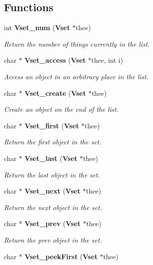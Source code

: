 \subsection*{Functions}
\begin{DoxyCompactItemize}
\item 
int {\bf Vset\+\_\+num} ({\bf Vset} $\ast$thee)
\begin{DoxyCompactList}\small\item\em Return the number of things currently in the list. \end{DoxyCompactList}\item 
char $\ast$ {\bf Vset\+\_\+access} ({\bf Vset} $\ast$thee, int i)
\begin{DoxyCompactList}\small\item\em Access an object in an arbitrary place in the list. \end{DoxyCompactList}\item 
char $\ast$ {\bf Vset\+\_\+create} ({\bf Vset} $\ast$thee)
\begin{DoxyCompactList}\small\item\em Create an object on the end of the list. \end{DoxyCompactList}\item 
char $\ast$ {\bf Vset\+\_\+first} ({\bf Vset} $\ast$thee)
\begin{DoxyCompactList}\small\item\em Return the first object in the set. \end{DoxyCompactList}\item 
char $\ast$ {\bf Vset\+\_\+last} ({\bf Vset} $\ast$thee)
\begin{DoxyCompactList}\small\item\em Return the last object in the set. \end{DoxyCompactList}\item 
char $\ast$ {\bf Vset\+\_\+next} ({\bf Vset} $\ast$thee)
\begin{DoxyCompactList}\small\item\em Return the next object in the set. \end{DoxyCompactList}\item 
char $\ast$ {\bf Vset\+\_\+prev} ({\bf Vset} $\ast$thee)
\begin{DoxyCompactList}\small\item\em Return the prev object in the set. \end{DoxyCompactList}\item 
char $\ast$ {\bf Vset\+\_\+peek\+First} ({\bf Vset} $\ast$thee)

\end{DoxyCompactItemize}
